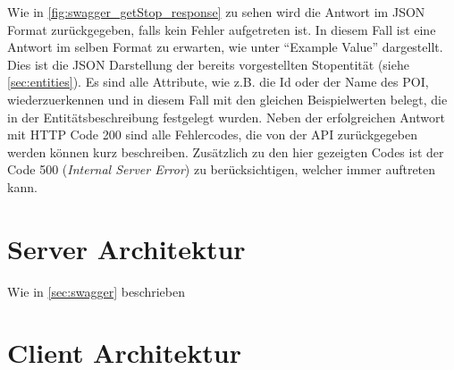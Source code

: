 \begin{itemize}
	Wie in \autoref{fig:swagger_getStop_response} zu sehen wird die Antwort im JSON Format zurückgegeben, falls kein Fehler aufgetreten ist. In diesem Fall ist eine Antwort im selben Format zu erwarten, wie unter \enquote{Example Value} dargestellt. Dies ist die JSON Darstellung der bereits vorgestellten Stopentität (siehe \autoref{sec:entities}). Es sind alle Attribute, wie z.B. die Id oder der Name des POI, wiederzuerkennen und in diesem Fall mit den gleichen Beispielwerten belegt, die in der Entitätsbeschreibung festgelegt wurden. Neben der erfolgreichen Antwort mit HTTP Code 200 sind alle Fehlercodes, die von der API zurückgegeben werden können kurz beschreiben. Zusätzlich zu den hier gezeigten Codes ist der Code 500 (\textit{Internal Server Error}) zu berücksichtigen, welcher immer auftreten kann.
	
	\newpage
	
	\end{itemize}
		
	\section{Server Architektur}
	
	Wie in \autoref{sec:swagger} beschrieben 
	
	\section{Client Architektur}
	